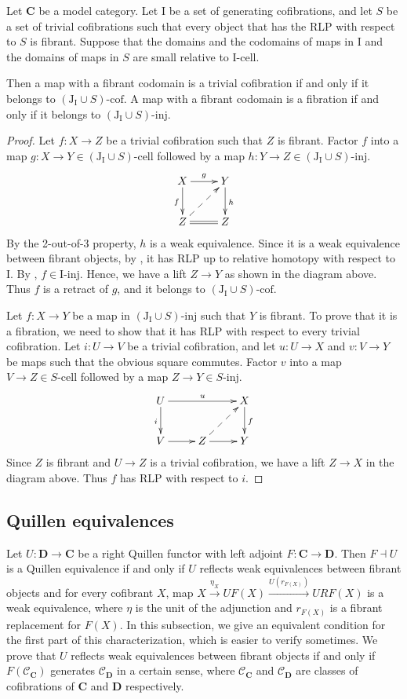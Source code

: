 \documentclass{tac}
\theoremstyle{definition}
\newcommand{\cof}{\mathcal{C}}
\newcommand{\cat}[1]{\mathbf{#1}}
\newcommand{\C}{\cat{C}}
\newcommand{\D}{\cat{D}}
\newcommand{\I}{\mathrm{I}}
\newcommand{\J}{\mathrm{J}}
\newcommand{\class}[2]{#1\text{-}\mathrm{#2}}
\newcommand{\Iinj}[1][\I]{\class{#1}{inj}}
\newcommand{\Icell}[1][\I]{\class{#1}{cell}}
\newcommand{\Icof}[1][\I]{\class{#1}{cof}}
\begin{document}
\begin{prop}
Let $\C$ be a model category.
Let $\I$ be a set of generating cofibrations, and let $S$ be a set of trivial cofibrations
such that every object that has the RLP with respect to $S$ is fibrant.
Suppose that the domains and the codomains of maps in $\I$ and the domains of maps in $S$ are small relative to $\Icell$.

Then a map with a fibrant codomain is a trivial cofibration if and only if it belongs to $\Icof[(\J_\I \cup S)]$.
A map with a fibrant codomain is a fibration if and only if it belongs to $\Iinj[(\J_\I \cup S)]$.
\end{prop}
\begin{proof}
Let $f : X \to Z$ be a trivial cofibration such that $Z$ is fibrant.
Factor $f$ into a map $g : X \to Y \in \Icell[(\J_\I \cup S)]$ followed by a map $h : Y \to Z \in \Iinj[(\J_\I \cup S)]$.
\[ \xymatrix{ X \ar[r]^g \ar[d]_f & Y \ar[d]^h \\
              Z \ar@{=}[r] \ar@{-->}[ur] & Z
            } \]
By the 2-out-of-3 property, $h$ is a weak equivalence.
Since it is a weak equivalence between fibrant objects, by , it has RLP up to relative homotopy with respect to $\I$.
By , $f \in \Iinj$.
Hence, we have a lift $Z \to Y$ as shown in the diagram above.
Thus $f$ is a retract of $g$, and it belongs to $\Icof[(\J_\I \cup S)]$.

Let $f : X \to Y$ be a map in $\Iinj[(\J_\I \cup S)]$ such that $Y$ is fibrant.
To prove that it is a fibration, we need to show that it has RLP with respect to every trivial cofibration.
Let $i : U \to V$ be a trivial cofibration, and let $u : U \to X$ and $v : V \to Y$ be maps such that the obvious square commutes.
Factor $v$ into a map $V \to Z \in \Icell[S]$ followed by a map $Z \to Y \in \Iinj[S]$.
\[ \xymatrix{ U \ar[rr]^u \ar[d]_i & & X \ar[d]^f \\
              V \ar[r] & Z \ar[r] \ar@{-->}[ur] & Y
            } \]
Since $Z$ is fibrant and $U \to Z$ is a trivial cofibration, we have a lift $Z \to X$ in the diagram above.
Thus $f$ has RLP with respect to $i$.
\end{proof}

\subsection{Quillen equivalences}

Let $U : \D \to \C$ be a right Quillen functor with left adjoint $F : \C \to \D$.
Then $F \dashv U$ is a Quillen equivalence if and only if $U$ reflects weak equivalences between fibrant objects and
for every cofibrant $X$, map $X \xrightarrow{\eta_X} UF(X) \xrightarrow{U(r_{F(X)})} URF(X)$ is a weak equivalence,
where $\eta$ is the unit of the adjunction and $r_{F(X)}$ is a fibrant replacement for $F(X)$.
In this subsection, we give an equivalent condition for the first part of this characterization, which is easier to verify sometimes.
We prove that $U$ reflects weak equivalences between fibrant objects if and only if $F(\cof_\C)$ generates $\cof_\D$ in a certain sense,
where $\cof_\C$ and $\cof_\D$ are classes of cofibrations of $\C$ and $\D$ respectively.
\end{document}
